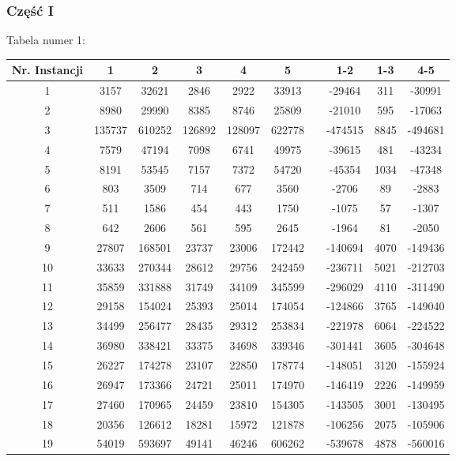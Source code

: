 \documentclass{article}
\begin{document}
\newpage
\subsubsection{Część I}
Tabela numer 1:
\begin{table}[h!]
\centering
\begin{tabular}{c||c|c|c||c|c c c|c|c} 
Nr. Instancji & 1 & 2 & 3 & 4 & 5 &  & 1-2 & 1-3 & 4-5 \\
\hline
1 & 3157 & 32621 & 2846 & 2922 & 33913 &  & -29464 & 311 & -30991 \\
2 & 8980 & 29990 & 8385 & 8746 & 25809 &  & -21010 & 595 & -17063 \\
3 & 135737 & 610252 & 126892 & 128097 & 622778 &  & -474515 & 8845 & -494681 \\
4 & 7579 & 47194 & 7098 & 6741 & 49975 &  & -39615 & 481 & -43234 \\
5 & 8191 & 53545 & 7157 & 7372 & 54720 &  & -45354 & 1034 & -47348 \\
6 & 803 & 3509 & 714 & 677 & 3560 &  & -2706 & 89 & -2883 \\
7 & 511 & 1586 & 454 & 443 & 1750 &  & -1075 & 57 & -1307 \\
8 & 642 & 2606 & 561 & 595 & 2645 &  & -1964 & 81 & -2050 \\
9 & 27807 & 168501 & 23737 & 23006 & 172442 &  & -140694 & 4070 & -149436 \\
10 & 33633 & 270344 & 28612 & 29756 & 242459 &  & -236711 & 5021 & -212703 \\
11 & 35859 & 331888 & 31749 & 34109 & 345599 &  & -296029 & 4110 & -311490 \\
12 & 29158 & 154024 & 25393 & 25014 & 174054 &  & -124866 & 3765 & -149040 \\
13 & 34499 & 256477 & 28435 & 29312 & 253834 &  & -221978 & 6064 & -224522 \\
14 & 36980 & 338421 & 33375 & 34698 & 339346 &  & -301441 & 3605 & -304648 \\
15 & 26227 & 174278 & 23107 & 22850 & 178774 &  & -148051 & 3120 & -155924 \\
16 & 26947 & 173366 & 24721 & 25011 & 174970 &  & -146419 & 2226 & -149959 \\
17 & 27460 & 170965 & 24459 & 23810 & 154305 &  & -143505 & 3001 & -130495 \\
18 & 20356 & 126612 & 18281 & 15972 & 121878 &  & -106256 & 2075 & -105906 \\
19 & 54019 & 593697 & 49141 & 46246 & 606262 &  & -539678 & 4878 & -560016 \\

\end{tabular}
\end{table}
\end{document}
